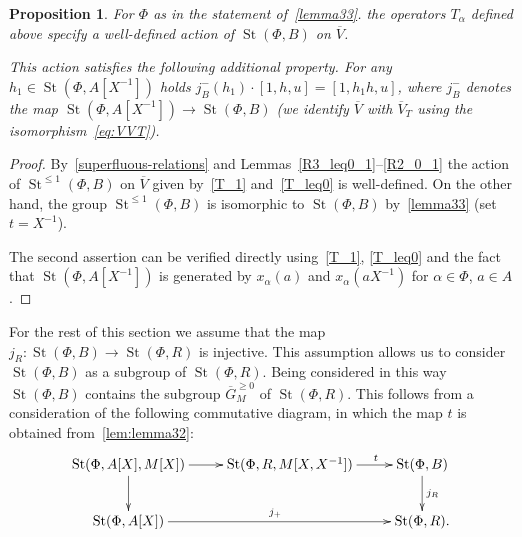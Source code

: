 \documentclass[oneside, 8pt]{amsart}
\newtheorem{prop}[lemma]{Proposition}
\theoremstyle{remark}
\theoremstyle{definition}
\numberwithin{lemma}{section}
\numberwithin{prop}{section}
\numberwithin{corollary}{section}
\numberwithin{externaltheorem}{section}
\DeclareMathOperator{\St}{St}
\newcommand{\inv}{^{-1}}
\numberwithin{equation}{section}
\begin{document}
\begin{prop} \label{prop43}
For $\Phi$ as in the statement of~\cref{lemma33}.
the operators $T_\alpha$ defined above specify a well-defined action of $\St(\Phi, B)$ on $\overline{V}$. 

This action satisfies the following additional property. For any $h_1 \in \St(\Phi, A[X\inv])$ holds $j_B^-(h_1) \cdot [1, h, u] = [1, h_1 h, u]$, where $j_B^-$ denotes the map $\St(\Phi, A[X\inv]) \to \St(\Phi, B)$ (we identify $\overline{V}$ with $\overline{V}_T$ using the isomorphism~\eqref{eq:VVT}).
\end{prop}
\begin{proof}
  By~\cref{superfluous-relations} and Lemmas~\ref{R3_leq0_1}--\ref{R2_0_1} the action of $\St^{\leq 1}(\Phi, B)$ on $\overline{V}$ given by~\eqref{T_1} and~\eqref{T_leq0} is well-defined. On the other hand, the group $\St^{\leq 1}(\Phi, B)$ is isomorphic to $\St(\Phi, B)$ by~\cref{lemma33} (set $t = X^{-1}$).
  
  The second assertion can be verified directly using~\eqref{T_1}, \eqref{T_leq0} and the fact that $\St(\Phi, A[X\inv])$ is generated by $x_\alpha(a)$ and $x_\alpha(aX\inv)$ for $\alpha\in\Phi$, $a\in A$.
\end{proof}

For the rest of this section we assume that the map $j_R \colon \St(\Phi, B) \to \St(\Phi, R)$ is injective. 
This assumption allows us to consider $\St(\Phi, B)$ as a subgroup of $\St(\Phi, R)$.
Being considered in this way $\St(\Phi, B)$ contains the subgroup $\overline{G}^{\geq 0}_M$ of $\St(\Phi, R)$.
This follows from a consideration of the following commutative diagram, in which the map $t$ is obtained from~\cref{lem:lemma32}:
\[ \xymatrix{ \St(\Phi, A[X], M[X]) \ar[d] \ar[r] & \St(\Phi, R, M[X, X\inv]) \ar[r]^(.65){t} & \St(\Phi, B) \ar[d]^{j_R} \\
   \St(\Phi, A[X]) \ar[rr]^{j_+} & & \St(\Phi, R). } \]
\end{document}
